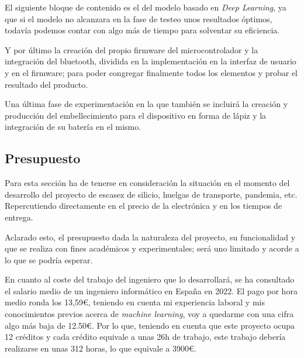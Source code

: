 El siguiente bloque de contenido es el del modelo basado en
\textit{Deep Learning}, ya que si el modelo no alcanzara en la fase de
testeo unos resultados óptimos, todavía podemos contar con algo más de
tiempo para solventar su eficiencia.

Y por último la creación del propio firmware del microcontrolador y la
integración del bluetooth, dividida en la implementación en la interfaz
de usuario y en el firmware; para
poder congregar finalmente todos los elementos y probar el resultado del producto.

Una última fase de experimentación en la que también se incluirá la creación
y producción del embellecimiento para el dispositivo en forma de lápiz y la
integración de su batería en el mismo.
\newpage
\subsection{Presupuesto\label{presupuesto}}
Para esta sección ha de tenerse en consideración la situación en el momento
del desarrollo del proyecto de escasez de silicio, huelgas de transporte, pandemia,
etc. Repercutiendo directamente en el precio de la electrónica y en los tiempos de
entrega.

Aclarado esto, el presupuesto dada la naturaleza del proyecto, su funcionalidad
y que se realiza con fines académicos y experimentales; será uno limitado y
acorde a lo que se podría esperar.

En cuanto al coste del trabajo del ingeniero que lo desarrollará, se ha consultado el salario
medio de un ingeniero informático en España en 2022\cite{salII}.
El pago por hora medio ronda los 13,59€, teniendo en cuenta mi experiencia laboral y mis
conocimientos previos acerca de \textit{machine learning}, voy a
quedarme con una cifra algo más baja de 12.50€. Por lo que, teniendo en cuenta que
este proyecto ocupa 12 créditos y cada crédito equivale a unas 26h de trabajo,
este trabajo debería realizarse en unas 312 horas, lo que equivale a 3900€.

